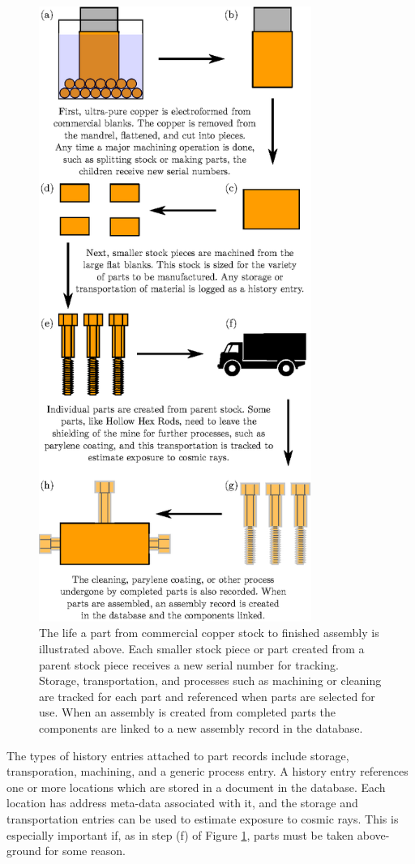 \documentclass[journal]{IEEEtran}
\begin{document}
\begin{figure}[!t]
\centering
\includegraphics[width=3.5in]{example_part}
\caption{The life a part from commercial copper stock to finished assembly is illustrated above. Each smaller stock piece or part created from a
parent stock piece receives a new serial number for tracking.
Storage, transportation, and processes such as machining or cleaning are tracked for each part and
referenced when parts are selected for use. When an assembly is created from completed parts 
the components are linked to a new assembly record in the database.}
\label{example_part}
\end{figure}

The types of history entries attached to part records include storage, transporation, machining, and a generic process entry. 
A history entry references one or more locations which are stored in a document in the database. Each location has address meta-data
associated with it, and the storage and transportation entries can be used to estimate exposure to cosmic rays. This is especially 
important if, as in step (f) of Figure \ref{example_part}, parts must be taken above-ground for some reason.
\end{document}
